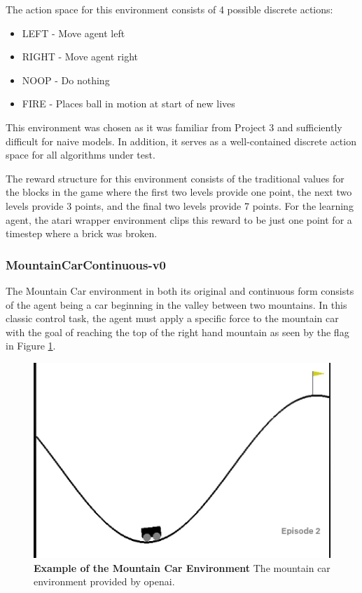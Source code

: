 \documentclass[conference]{IEEEtran}
\begin{document}
The action space for this environment consists of 4 possible discrete actions:

\begin{itemize}
    \item LEFT - Move agent left
    \item RIGHT - Move agent right
    \item NOOP - Do nothing
    \item FIRE - Places ball in motion at start of new lives
\end{itemize}

This environment was chosen as it was familiar from Project 3 and sufficiently difficult for naive models.
In addition, it serves as a well-contained discrete action space for all algorithms under test.

The reward structure for this environment consists of the traditional values for the blocks in the game where the first two levels provide one point, the next two levels provide 3 points, and the final two levels provide 7 points.
For the learning agent, the atari wrapper environment clips this reward to be just one point for a timestep where a brick was broken.

\subsubsection{MountainCarContinuous-v0}
The Mountain Car environment in both its original and continuous form consists of the agent being a car beginning in the valley between two mountains.
In this classic control task, the agent must apply a specific force to the mountain car with the goal of reaching the top of the right hand mountain as seen by the flag in Figure \ref{fig:mountainCarEnvironment}.

\begin{figure}[htbp]
\centerline{\includegraphics[scale=0.5]{mountain_car.png}}
\caption{\textbf{Example of the Mountain Car Environment}  The mountain car environment provided by openai.}
\label{fig:mountainCarEnvironment}
\end{figure}
\end{document}
